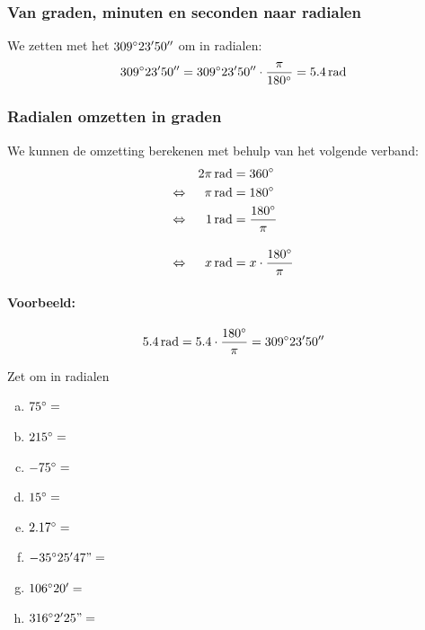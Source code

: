 \documentclass[a4paper,12pt,twoside]{article}
\begin{document}
\subsubsection*{Van graden, minuten en seconden naar radialen}

We zetten met het  $309^\circ 23' 50''$ om in radialen:
$$309\degree 23' 50''=309\degree 23' 50''\cdot \dfrac{\pi}{180\degree}=5.4\rad$$

\subsubsection*{Radialen omzetten in graden}
We kunnen de omzetting berekenen met behulp van het volgende verband:
\begin{alignat*}{2}
     &&2\pi\rad &=360\degree\\
\LRA &&\pi \rad &=180\degree\\
\LRA &&  1 \rad &= \frac{180\degree}{\pi}\\[1em]
\LRA &&  x \rad &= x\cdot\frac{180\degree}{\pi}
\end{alignat*}

\paragraph{Voorbeeld:}
$$5.4 \rad=5.4\cdot\dfrac{180\degree}{\pi}=309\degree 23' 50''$$

\begin{oefening} Zet om in radialen
\begin{multicols}{2}
\begin{enumerate}[(a)]
  \itemsep1em
  \item $75^\circ=$\arulefill
  \item $215^\circ=$\arulefill
  \item $-75^\circ=$\arulefill
  \item $15^\circ=$\arulefill
  \item $2.17^\circ=$\arulefill
  \item $-35^\circ25'47"=$\arulefill
  \item $106^\circ20'=$\arulefill
  \item $316^\circ2'25"=$\arulefill
\end{enumerate}
\end{multicols}
\end{oefening}
\end{document}
